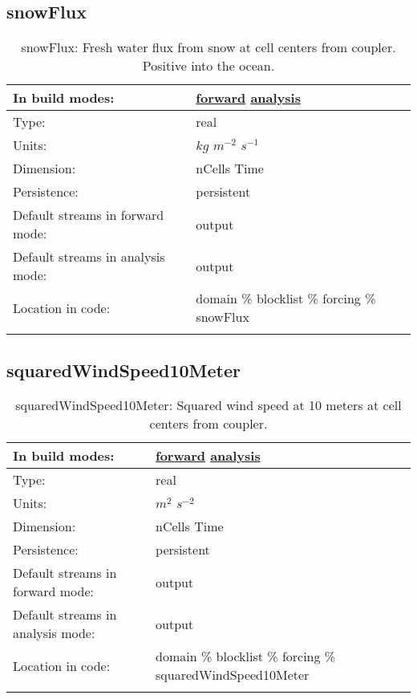 \subsection[snowFlux]{snowFlux}
\label{subsec:var_sec_forcing_snowFlux}
\begin{center}
\begin{longtable}{| p{2.0in} | p{4.0in} |}
        \hline 
        In build modes: & \hyperref[subsec:forward_var_tab_forcing]{forward} \hyperref[subsec:analysis_var_tab_forcing]{analysis} \\
        \hline 
        Type: & real \\
        \hline 
        Units: & $kg$ $m^{-2}$ $s^{-1}$ \\
        \hline 
        Dimension: & nCells Time \\
        \hline 
        Persistence: & persistent \\
        \hline 
		 Default streams in forward mode: &  output \\
        \hline 
		 Default streams in analysis mode: &  output \\
        \hline 
		 Location in code: & domain \% blocklist \% forcing \% snowFlux \\
		 \hline 
    \caption{snowFlux: Fresh water flux from snow at cell centers from coupler. Positive into the ocean.}
\end{longtable}
\end{center}
\subsection[squaredWindSpeed10Meter]{squaredWindSpeed10Meter}
\label{subsec:var_sec_forcing_squaredWindSpeed10Meter}
\begin{center}
\begin{longtable}{| p{2.0in} | p{4.0in} |}
        \hline 
        In build modes: & \hyperref[subsec:forward_var_tab_forcing]{forward} \hyperref[subsec:analysis_var_tab_forcing]{analysis} \\
        \hline 
        Type: & real \\
        \hline 
        Units: & $m^2$ $s^{-2}$ \\
        \hline 
        Dimension: & nCells Time \\
        \hline 
        Persistence: & persistent \\
        \hline 
		 Default streams in forward mode: &  output \\
        \hline 
		 Default streams in analysis mode: &  output \\
        \hline 
		 Location in code: & domain \% blocklist \% forcing \% squaredWindSpeed10Meter \\
		 \hline 
    \caption{squaredWindSpeed10Meter: Squared wind speed at 10 meters at cell centers from coupler.}
\end{longtable}
\end{center}
